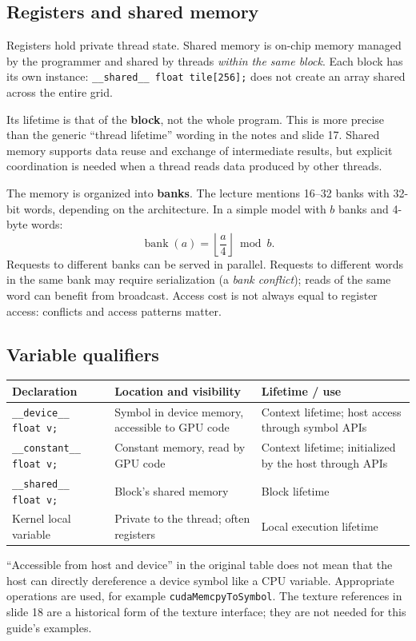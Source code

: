 \documentclass[11pt,a4paper]{article}
\let\originalsubsection\subsection
\renewcommand{\subsection}{\Needspace{5\baselineskip}\originalsubsection}
\begin{document}
\subsection{Registers and shared memory}
Registers hold private thread state. Shared memory is on-chip memory
managed by the programmer and shared by threads \emph{within the same
block}. Each block has its own instance:
\texttt{\_\_shared\_\_ float tile[256];} does not create an array shared
across the entire grid.

Its lifetime is that of the \textbf{block}, not the whole program.
This is more precise than the generic ``thread lifetime'' wording in the
notes and slide 17. Shared memory supports data reuse and exchange of
intermediate results, but explicit coordination is needed when a thread
reads data produced by other threads.

The memory is organized into \textbf{banks}. The lecture mentions 16--32
banks with 32-bit words, depending on the architecture. In a simple model
with $b$ banks and 4-byte words:
\[
\operatorname{bank}(a)=\left\lfloor\frac{a}{4}\right\rfloor\bmod b.
\]
Requests to different banks can be served in parallel. Requests to different
words in the same bank may require serialization (a \emph{bank conflict});
reads of the same word can benefit from broadcast. Access cost is not
always equal to register access: conflicts and access patterns matter.

\subsection{Variable qualifiers}
\begin{center}\small
\begin{tabularx}{\linewidth}{@{}lXX@{}}\toprule
Declaration & Location and visibility & Lifetime / use \\\midrule
\texttt{\_\_device\_\_ float v;} & Symbol in device memory, accessible to GPU code & Context lifetime; host access through symbol APIs \\
\texttt{\_\_constant\_\_ float v;} & Constant memory, read by GPU code & Context lifetime; initialized by the host through APIs \\
\texttt{\_\_shared\_\_ float v;} & Block's shared memory & Block lifetime \\
Kernel local variable & Private to the thread; often registers & Local execution lifetime \\\bottomrule
\end{tabularx}\end{center}
``Accessible from host and device'' in the original table does not mean
that the host can directly dereference a device symbol like a CPU variable.
Appropriate operations are used, for example \texttt{cudaMemcpyToSymbol}.
The texture references in slide 18 are a historical form of the texture
interface; they are not needed for this guide's examples.
\end{document}
